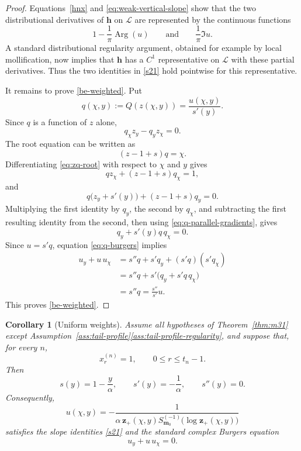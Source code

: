 \documentclass[11pt]{amsart}
\theoremstyle{plain}
\newtheorem{corollary}[theorem]{Corollary}
\numberwithin{equation}{section}
\numberwithin{theorem}{section}
\numberwithin{figure}{section}
\begin{document}
\begin{proof}
Equations~\eqref{hnx} and \eqref{eq:weak-vertical-slope} show that
the two distributional derivatives of $\mathbf h$ on $\mathcal L$ are
represented by the continuous functions
\[
    1-\frac{1}{\pi}\operatorname{Arg}(u)
    \qquad\text{and}\qquad
    \frac{1}{\pi}\Im u.
\]
A standard distributional regularity argument, obtained for example by
local mollification, now implies that $\mathbf h$ has a $C^1$
representative on $\mathcal L$ with these partial derivatives. Thus the
two identities in \eqref{s21} hold pointwise for this representative.

It remains to prove \eqref{be-weighted}. Put
\[
    q(\chi,y):=Q(z(\chi,y))=\frac{u(\chi,y)}{s'(y)}.
\]
Since $q$ is a function of $z$ alone,
\begin{equation}
    q_\chi z_y-q_yz_\chi=0.
    \label{eq:q-parallel-gradients}
\end{equation}
The root equation can be written as
\begin{equation}
    (z-1+s)q=\chi.
    \label{eq:zq-root}
\end{equation}
Differentiating \eqref{eq:zq-root} with respect to $\chi$ and $y$
gives
\[
    qz_\chi+(z-1+s)q_\chi=1,
\]
and
\[
    q\bigl(z_y+s'(y)\bigr)+(z-1+s)q_y=0.
\]
Multiplying the first identity by $q_y$, the second by $q_\chi$,
and subtracting the first resulting identity from the second, then using
\eqref{eq:q-parallel-gradients}, gives
\begin{equation}
    q_y+s'(y)q\,q_\chi=0.
    \label{eq:q-burgers}
\end{equation}
Since $u=s'q$, equation \eqref{eq:q-burgers} implies
\begin{align*}
    u_y+u\,u_\chi
    &=
    s''q+s'q_y+(s'q)(s'q_\chi)\\
    &=
    s''q+s'\bigl(q_y+s'q\,q_\chi\bigr)\\
    &=
    s''q
    =
    \frac{s''}{s'}u.
\end{align*}
This proves \eqref{be-weighted}.
\end{proof}

\begin{corollary}[Uniform weights]
\label{cor:uniform-burgers}
Assume all hypotheses of Theorem~\ref{thm:m31} except
Assumption~\ref{ass:tail-profile}\ref{ass:tail-profile-regularity}, and
suppose that, for every $n$,
\begin{equation}
    x_r^{(n)}=1,
    \qquad
    0\leq r\leq t_n-1.
    \label{uw}
\end{equation}
Then
\[
    s(y)=1-\frac{y}{\alpha},
    \qquad
    s'(y)=-\frac{1}{\alpha},
    \qquad
    s''(y)=0.
\]
Consequently,
\[
    u(\chi,y)
    =
    -\frac{1}{
        \alpha\,
        \mathbf z_+(\chi,y)
        S_{\mathbf m_0}^{(-1)}
        \bigl(\log\mathbf z_+(\chi,y)\bigr)
    }
\]
satisfies the slope identities \eqref{s21} and the standard complex
Burgers equation
\begin{equation}
    u_y+u\,u_\chi=0.
    \label{be}
\end{equation}
\end{corollary}
\end{document}
